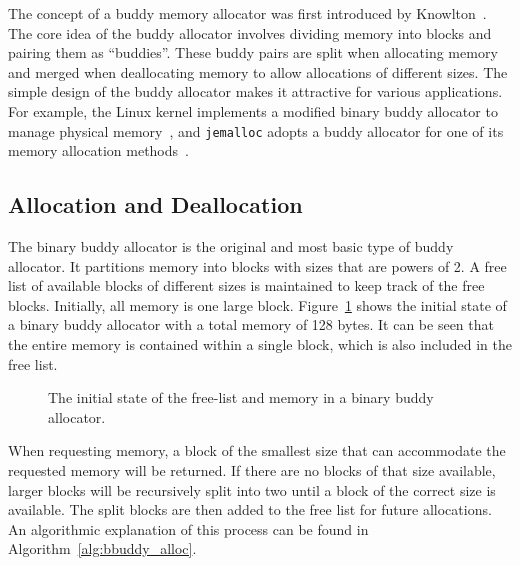 The concept of a buddy memory allocator was first introduced by Knowlton~\cite{buddyog}. The core idea of the buddy allocator involves dividing memory into blocks and pairing them as ``buddies''. These buddy pairs are split when allocating memory and merged when deallocating memory to allow allocations of different sizes. The simple design of the buddy allocator makes it attractive for various applications. For example, the Linux kernel implements a modified binary buddy allocator to manage physical memory~\cite{linuxbuddy}, and \texttt{jemalloc} adopts a buddy allocator for one of its memory allocation methods~\cite{jemalloc}.

\subsection{Allocation and Deallocation}
The binary buddy allocator is the original and most basic type of buddy allocator. It partitions memory into blocks with sizes that are powers of 2. A free list of available blocks of different sizes is maintained to keep track of the free blocks. Initially, all memory is one large block. Figure~\ref{fig:buddystart} shows the initial state of a binary buddy allocator with a total memory of 128 bytes. It can be seen that the entire memory is contained within a single block, which is also included in the free list.

\begin{figure}[h]
    \centering
    
    \caption{The initial state of the free-list and memory in a binary buddy allocator.}
    \label{fig:buddystart}
\end{figure}

When requesting memory, a block of the smallest size that can accommodate the requested memory will be returned. If there are no blocks of that size available, larger blocks will be recursively split into two until a block of the correct size is available. The split blocks are then added to the free list for future allocations. An algorithmic explanation of this process can be found in Algorithm~\ref{alg:bbuddy_alloc}.

